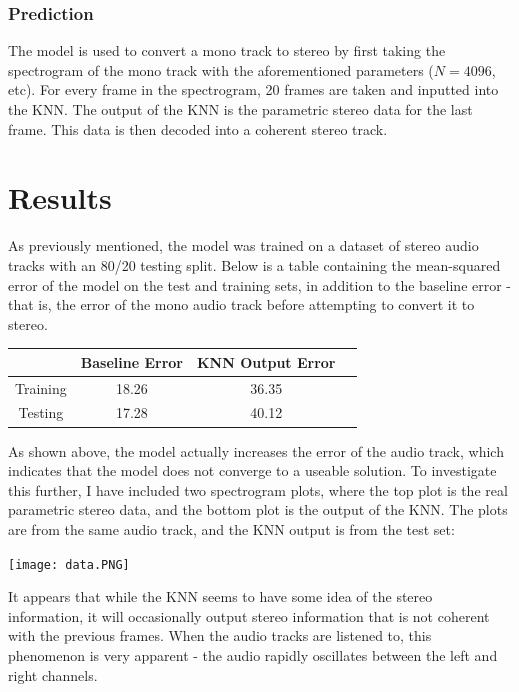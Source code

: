 \documentclass{article}
\begin{document}
\subsubsection{Prediction}
The model is used to convert a mono track to stereo by first taking the spectrogram of the mono track with the aforementioned parameters ($N=4096$, etc). For every frame in the spectrogram, 20 frames are taken and inputted into the KNN. The output of the KNN is the parametric stereo data for the last frame. This data is then decoded into a coherent stereo track.

\section{Results}

As previously mentioned, the model was trained on a dataset of stereo audio tracks with an 80/20 testing split. Below is a table containing the mean-squared error of the model on the test and training sets, in addition to the baseline error - that is, the error of the mono audio track before attempting to convert it to stereo.

\begin{center}
  \begin{tabular}{ |c|c|c|c| } 
   \hline
   & Baseline Error & KNN Output Error \\ 
   \hline
   Training & 18.26 & 36.35 \\ 
   \hline
   Testing & 17.28 & 40.12 \\ 
   \hline
  \end{tabular}
\end{center}

As shown above, the model actually increases the error of the audio track, which indicates that the model does not converge to a useable solution. To investigate this further, I have included two spectrogram plots, where the top plot is the real parametric stereo data, and the bottom plot is the output of the KNN. The plots are from the same audio track, and the KNN output is from the test set:

\begin{center}
  \texttt{[image: data.PNG]}
\end{center}

It appears that while the KNN seems to have some idea of the stereo information, it will occasionally output stereo information that is not coherent with the previous frames. When the audio tracks are listened to, this phenomenon is very apparent - the audio rapidly oscillates between the left and right channels.
\end{document}

